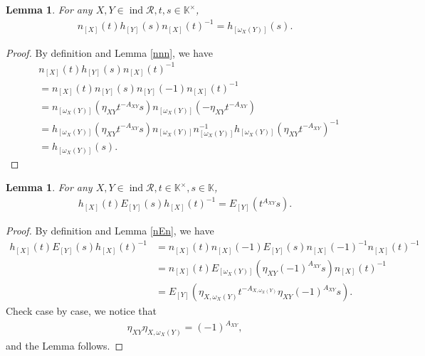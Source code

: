 \documentclass[12pt]{amsart}
\newtheorem{lemma}[theorem]{Lemma}
\begin{document}
\begin{lemma} \label{nhn}
    For any $X,Y \in \operatorname{ind}\mathcal{R},  t,s \in \mathbb{K}^{\times}$,
    \begin{align*}
        n_{[X]}(t) h_{[Y]}(s) n_{[X]}(t)^{-1} = h_{[\omega_X(Y)]}(s).  
    \end{align*}
    
\end{lemma}

\begin{proof}
    By definition and Lemma \ref{nnn}, we have 
    \begin{align*}
       & n_{[X]}(t) h_{[Y]}(s) n_{[X]}(t)^{-1} \\
       &= n_{[X]}(t) n_{[Y]}(s) n_{[Y]}(-1) n_{[X]}(t)^{-1} \\
       &= n_{[\omega_X(Y)]}(\eta_{XY}t^{-A_{XY}}s) n_{[\omega_X(Y)]}(-\eta_{XY}t^{-A_{XY}}) \\
       &= h_{[\omega_X(Y)]}(\eta_{XY}t^{-A_{XY}}s) n_{[\omega_X(Y)]} n_{[\omega_X(Y)]}^{-1}  h_{[\omega_X(Y)]}(\eta_{XY}t^{-A_{XY}})^{-1} \\
       &= h_{[\omega_X(Y)]}(s).
    \end{align*}
\end{proof}


\begin{lemma} \label{hEh}
    For any  $ X,Y \in \operatorname{ind}\mathcal{R},  t \in \mathbb{K}^{\times}, s \in \mathbb{K}$,
    \begin{align*}
        h_{[X]}(t) E_{[Y]}(s) h_{[X]}(t)^{-1} = E_{[Y]}(t^{A_{XY}}s).
    \end{align*} 
\end{lemma}

\begin{proof}
By definition and Lemma \ref{nEn}, we have 
    \begin{align*}
        h_{[X]}(t) E_{[Y]}(s) h_{[X]}(t)^{-1} &= n_{[X]}(t) n_{[X]}(-1) E_{[Y]}(s) n_{[X]}(-1)^{-1} n_{[X]}(t)^{-1} \\
            &= n_{[X]}(t)  E_{[\omega_X(Y)]}(\eta_{XY}(-1)^{A_{XY}}s) n_{[X]}(t)^{-1} \\
            &= E_{[Y]}(\eta_{X,\omega_X(Y)}t^{-A_{X,\omega_X(Y)}} \eta_{XY} (-1)^{A_{XY}} s).
    \end{align*}
    Check case by case, we notice that 
    \begin{align*}
        \eta_{XY} \eta_{X,\omega_X(Y)} = (-1)^{A_{XY}},
    \end{align*}
    and the Lemma follows.
\end{proof}
\end{document}
